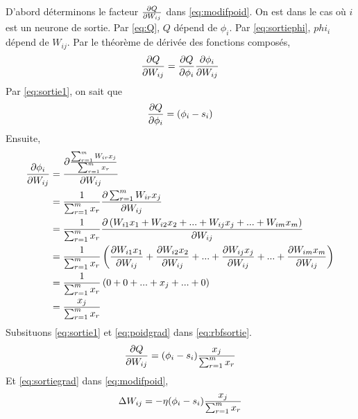 D'abord déterminons le facteur $\frac{\partial Q}{\partial W_{ij}}$ dans \eqref{eq:modifpoid}. On est dans le cas où $i$ est un neurone de sortie.
Par \eqref{eq:Q}, $Q$ dépend de $\phi_i$. Par \eqref{eq:sortiephi}, $phi_i$ dépend de $W_{ij}$.
Par le théorème de dérivée des fonctions composés,
\begin{equation}\label{eq:rbfsortie}
 \frac{\partial Q}{\partial W_{ij}} = \frac{\partial Q}{\partial \phi_i} \frac{\partial \phi_i}{\partial W_{ij}}
\end{equation}
Par \eqref{eq:sortie1}, on sait que
\[\frac{\partial Q}{\partial \phi_i} = (\phi_i - s_i)\]
Ensuite,
\begin{equation}\label{eq:poidgrad}
 \begin{split}
  \frac{\partial \phi_i}{\partial W_{ij}} & = \frac{\partial \frac{\sum_{r=1}^{m}W_{ir}x_{j}}{\sum_{r=1}^{m}x_{r}}}{\partial W_{ij}}\\
  ~ & = \frac{1}{\sum_{r=1}^{m}x_{r}} \frac{\partial \sum_{r=1}^{m}W_{ir}x_{j}}{\partial W_{ij}}\\
  ~ & = \frac{1}{\sum_{r=1}^{m}x_{r}} \frac{\partial \left(W_{i1}x_1 + W_{i2}x_2 + ... + W_{ij}x_j + ... + W_{im}x_m\right)}{\partial W_{ij}}\\
  ~ & = \frac{1}{\sum_{r=1}^{m}x_{r}} \left(\frac{\partial W_{i1}x_1}{\partial W_{ij}} + \frac{\partial W_{i2}x_2}{\partial W_{ij}} + ... + \frac{\partial W_{ij}x_j}{\partial W_{ij}} + ... + \frac{\partial W_{im}x_m}{\partial W_{ij}}\right)\\
  ~ & = \frac{1}{\sum_{r=1}^{m}x_{r}} \left(0 + 0 + ... + x_j + ... + 0\right)\\
  ~ & = \frac{x_j}{\sum_{r=1}^{m}x_{r}}
 \end{split}
\end{equation}
Subsituons \eqref{eq:sortie1} et \eqref{eq:poidgrad} dans \eqref{eq:rbfsortie}.
\begin{equation}\label{eq:sortiegrad}
 \frac{\partial Q}{\partial W_{ij}} = (\phi_i - s_i) \frac{x_j}{\sum_{r=1}^{m}x_{r}}
\end{equation}
Et \eqref{eq:sortiegrad} dans \eqref{eq:modifpoid},
\[\Delta W_{ij} = -\eta (\phi_i - s_i) \frac{x_j}{\sum_{r=1}^{m}x_{r}}\]\\

